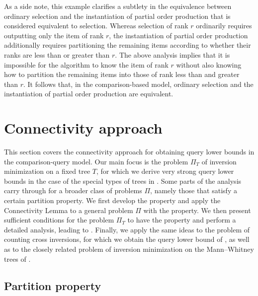 \documentclass{toc}
\begin{document}
As a side note, this example clarifies a subtlety in the equivalence between ordinary selection and the instantiation of partial order production that is considered equivalent to selection. Whereas selection of rank $r$ ordinarily requires outputting only the item
of rank $r$, the instantiation of partial order production additionally requires partitioning the remaining items according to whether their ranks are less than or greater than $r$. The above analysis implies that it is impossible for the algorithm to know the item of rank $r$ without also knowing how to partition the remaining items into those of rank less than and greater than $r$. It follows that, in the comparison-based model, ordinary selection and the instantiation of partial order production are equivalent. 



\section{Connectivity approach}
\label{sec:connectivity:both}

This section covers the connectivity approach for obtaining query lower bounds in the comparison-query model. Our main focus is the problem $\Pi_T$ of inversion minimization on a fixed tree $T$, for which we derive very strong query lower bounds in the case of the special types of trees in . Some parts of the analysis carry through for a broader class of problems $\Pi$, namely those that satisfy a certain partition property. We first develop the property and apply the Connectivity Lemma to a general
%
problem $\Pi$ with the property. We then present sufficient conditions for the problem $\Pi_T$ to have the property and perform a detailed analysis, leading to . Finally, we apply the same ideas to the problem of counting cross inversions, for which we obtain the query lower bound of , as well as to the closely related problem of inversion minimization on the Mann--Whitney trees of .

\subsection{Partition property}
\end{document}
